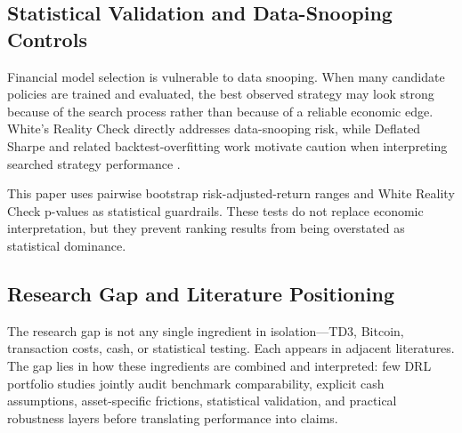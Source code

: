 \documentclass[11pt]{article}
\begin{document}
\subsection{Statistical Validation and Data-Snooping Controls}

Financial model selection is vulnerable to data snooping. When many candidate policies are trained and evaluated, the best observed strategy may look strong because of the search process rather than because of a reliable economic edge. White's Reality Check directly addresses data-snooping risk, while Deflated Sharpe and related backtest-overfitting work motivate caution when interpreting searched strategy performance \citep{white2000,bailey2014,lopezdeprado2020mlam}.

This paper uses pairwise bootstrap risk-adjusted-return ranges and White Reality Check p-values as statistical guardrails. These tests do not replace economic interpretation, but they prevent ranking results from being overstated as statistical dominance.

\subsection{Research Gap and Literature Positioning}

The research gap is not any single ingredient in isolation---TD3, Bitcoin, transaction costs, cash, or statistical testing. Each appears in adjacent literatures. The gap lies in how these ingredients are combined and interpreted: few DRL portfolio studies jointly audit benchmark comparability, explicit cash assumptions, asset-specific frictions, statistical validation, and practical robustness layers before translating performance into claims.
\end{document}

